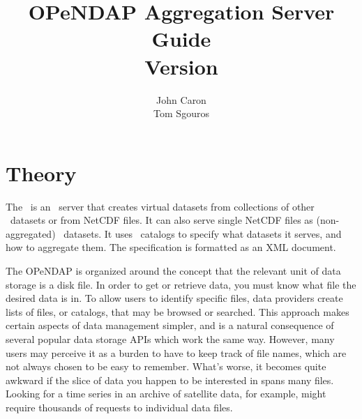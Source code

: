 \documentclass{dods-book}
\newcommand{\DOCversion}{Version \rcsInfoRevision}
\begin{document}
\title{OPeNDAP Aggregation Server Guide\\\DOCversion}
\author{John Caron\\Tom Sgouros}
\date{\rcsInfoDate}
\maketitle

\copyrightmatter

\W{}



\tableofcontents
\listoffigures

\clearemptydoublepage

%
%
%

\chapter{Theory}

The \AggServer\ is an \opendap\ server that creates virtual datasets
from collections of other \opendap\ datasets or from NetCDF files. It can
also serve single NetCDF files as (non-aggregated) \opendap\ datasets. It
uses \thredds\ catalogs to specify what datasets it serves, and how to
aggregate them.  The specification is formatted as an XML document.

  The \acf{OPeNDAP} is organized around the
concept that the relevant unit of data storage is a disk file.  In
order to get or retrieve data, you must know what file the desired
data is in.  To allow users to identify specific files, data providers
create lists of files, or catalogs, that may be browsed or searched.
This approach makes certain aspects of data management simpler, and is
a natural consequence of several popular data storage APIs which work
the same way.  However, many users may perceive it as a burden to have
to keep track of file names, which are not always chosen to be easy to
remember.  What's worse, it becomes quite awkward if the slice of data
you happen to be interested in spans many files.  Looking for a time
series in an archive of satellite data, for example, might require
thousands of requests to individual data files.
\end{document}
